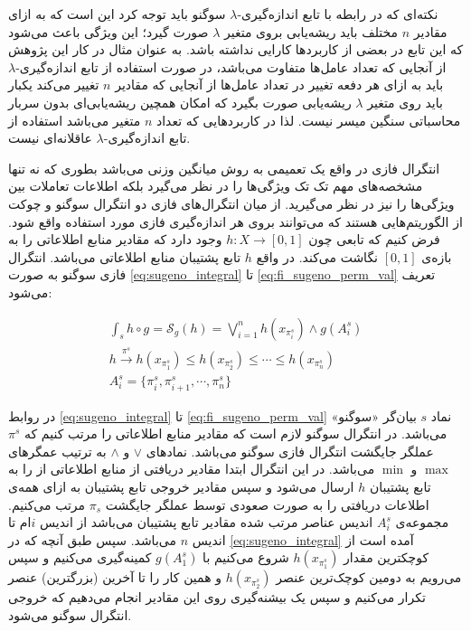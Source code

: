 نکته‌ای که در رابطه با تابع اندازه‌گیری-$\lambda$ سوگنو باید توجه کرد این است که به ازای مقادیر $n$ مختلف باید ریشه‌یابی بروی متغیر $\lambda$ صورت گیرد؛ این ویژگی‌ باعث می‌شود که این تابع در بعضی از کاربردها کارایی نداشته باشد. به عنوان مثال در کار این پژوهش از آنجایی که تعداد عامل‌ها متفاوت می‌باشد، در صورت استفاده از تابع اندازه‌گیری-$\lambda$ باید به ازای هر دفعه تغییر در تعداد عامل‌ها از آنجایی که مقادیر $n$ تغییر می‌کند یکبار باید روی متغیر $\lambda$ ریشه‌یابی صورت بگیرد که امکان همچین ریشه‌یابی‌‌ای بدون سربار محاسباتی سنگین میسر نیست. لذا در کاربردهایی که تعداد $n$ متغیر می‌باشد استفاده از تابع اندازه‌گیری-$\lambda$ عاقلانه‌ای نیست.

انتگرال فازی در واقع یک تعمیمی به روش میانگین وزنی می‌باشد بطوری که نه تنها مشخصه‌های مهم تک تک ویژگی‌ها را در نظر می‌گیرد بلکه اطلاعات تعاملات بین ویژگی‌ها را نیز در نظر می‌گیرید. از میان انتگرال‌های فازی دو انتگرال سوگنو و چوکت از الگوریتم‌هایی هستند که می‌توانند بروی هر اندازه‌گیری‌ فازی مورد استفاده واقع شود. فرض کنیم که تابعی چون
$h : X \rightarrow [0, 1]$
وجود دارد که مقادیر منابع اطلاعاتی را به بازه‌ی $[0,1]$ نگاشت می‌کند. در واقع $h$ تابع پشتیبان منابع اطلاعاتی می‌باشد. انتگرال فازی سوگنو به صورت
\ref{eq:sugeno_integral} تا \ref{eq:fi_sugeno_perm_val}
تعریف می‌شود:

\begin{eqnarray}
\int_{s} h \circ g = \mathcal{S}_g(h) = \bigvee_{i=1}^{n} h(x_{\pi_i^s}) \wedge g(A_i^s)\label{eq:sugeno_integral}\\
h \xrightarrow{\pi^s} h(x_{\pi_1^s}) \leq h(x_{\pi_2^s}) \leq \cdots \leq h(x_{\pi_n^s})\label{eq:fi_sugeno_perm_op}\\
A_i^s = \{\pi_i^s, \pi_{i+1}^s, \cdots, \pi_n^s\}\label{eq:fi_sugeno_perm_val}
\end{eqnarray}

در روابط
\ref{eq:sugeno_integral} تا \ref{eq:fi_sugeno_perm_val}
نماد $s$ بیان‌گر «سوگنو» می‌‌باشد. در انتگرال‌ سوگنو لازم است که مقادیر منابع اطلاعاتی را مرتب کنیم که $\pi^s$ عملگر جایگشت انتگرال فازی سوگنو می‌باشد. نمادهای $\vee$ و $\wedge$ به ترتیب عمگرهای $\max$ و $\min$ می‌باشد. در این انتگرال ابتدا مقادیر دریافتی از منابع اطلاعاتی از را به تابع پشتیبان $h$ ارسال می‌شود و سپس مقادیر خروجی تابع پشتیبان به ازای همه‌ی اطلاعات دریافتی را به صورت صعودی توسط عملگر جایگشت $\pi_s$ مرتب می‌کنیم. مجموعه‌ی $A_i^s$ اندیس عناصر مرتب شده مقادیر تابع پشتیبان می‌باشد از اندیس $i$ام تا اندیس $n$ می‌باشد. سپس طبق آنچه که در \ref{eq:sugeno_integral} آمده است از کوچکترین مقدار $h(x_{\pi_1^s})$ شروع می‌کنیم با $g(A_1^s)$ کمینه‌گیری می‌کنیم و سپس می‌رویم به دومین کوچک‌ترین عنصر $h(x_{\pi_2^s})$ و همین کار را تا آخرین (بزرگترین) عنصر تکرار می‌کنیم و سپس یک بیشنه‌گیری روی این مقادیر انجام می‌دهیم که خروجی انتگرال سوگنو می‌شود.

